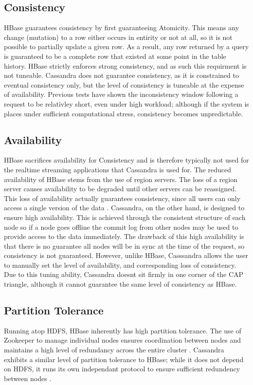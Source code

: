 \documentclass[10pt]{article}
\begin{document}
\subsection{Consistency}
HBase guarantees consistency by first guaranteeing Atomicity. This means any change (mutation) to a row either occurs in entirity or not at all, so it is not possible to partially update a given row. As a result, any row returned by a query is guaranteed to be a complete row that existed at some point in the table history. HBase strictly enforces strong consistency, and as such this requirment is not tuneable. Cassandra does not guarantee consistency, as it is constrained to eventual consistency only, but the level of consistency is tuneable at the expense of availability. Previous tests have shown the inconsistency window following a request to be relativley short, even under high workload; although if the system is places under sufficient computational stress, consistency becomes unpredictable. \citep{10.1007/978-3-319-04936-6_3}

\subsection{Availability}
HBase sacrifices availability for Consistency and is therefore typically not used for the realtime streaming applications that Cassandra is used for. The reduced availability of HBase stems from the use of region servers. The loss of a region server causes availability to be degraded until other servers can be reassigned. This loss of availability actually guarantees consistency, since all users can only access a single version of the data \citep{6885425}. Cassandra, on the other hand, is designed to ensure high availability. This is achieved through the consistent structure of each node so if a node goes offline the commit log from other nodes may be used to provide access to the data immediately. The drawback of this high availability is that there is no guarantee all nodes will be in sync at the time of the request, so consistency is not guaranteed. However, unlike HBase, Casssandra allows the user to manually set the level of availability, and corresponding loss of consistency. Due to this tuning ability, Cassandra doesnt sit firmly in one corner of the CAP triangle, although it cannot guarantee the same level of consistency as HBase.

\subsection{Partition Tolerance}
Running atop HDFS, HBase inherently has high partition tolerance. The use of Zookeeper to manage individual nodes ensures coordination between nodes and maintains a high level of redundancy across the entire cluster \citep{6846507}. Cassandra exhibits a similar level of partition tolerance to HBase; while it does not depend on HDFS, it runs its own independant protocol to ensure sufficient redundency between nodes \citep{DBLP:journals/corr/RahmanTNGV15}.
\end{document}
